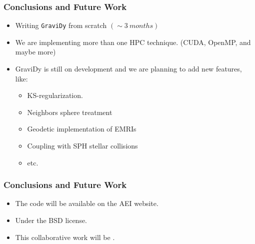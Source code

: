 \begin{frame}
    \frametitle{Conclusions and Future Work}

    \begin{itemize}
        \item Writing \texttt{GraviDy} from scratch $\left(\sim 3\ months\right)$
        \item We are implementing more than one HPC technique.
            (CUDA, OpenMP, and maybe more)
        \item GraviDy is still on development and we are planning
            to add new features, like:
        \begin{itemize}
            \item KS-regularization.
            \item Neighbors sphere treatment
            \item Geodetic implementation of EMRIs
            \item Coupling with SPH stellar collisions
            \item etc.
        \end{itemize}
    \end{itemize}
\end{frame}

\begin{frame}
    \frametitle{Conclusions and Future Work}
    \begin{itemize}
        \item The code will be available on the AEI website.
        \item Under the BSD license.
        \item This collaborative work will be .
    \end{itemize}
\end{frame}
